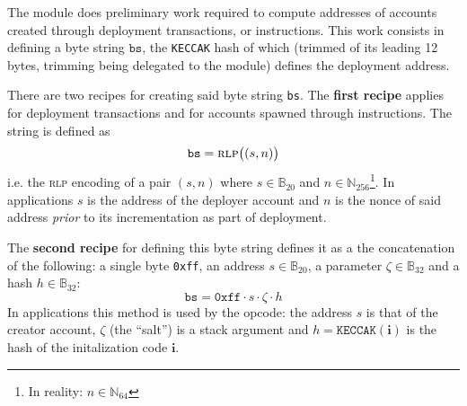The \rlpAddrMod{} module does preliminary work required to compute addresses of accounts created through deployment transactions,  or  instructions. This work consists in defining a byte string $\texttt{bs}$, the \texttt{KECCAK} hash of which (trimmed of its leading 12 bytes, trimming being delegated to the \trmMod{} module) defines the deployment address.

There are two recipes for creating said byte string \texttt{bs}. The \textbf{first recipe} applies for deployment transactions and for accounts spawned through  instructions. The string is defined as
\[
    \texttt{bs} = \textsc{rlp}\big((s,n)\big)
\]
i.e. the \textsc{rlp} encoding of a pair $(s, n)$ where $s \in \mathbb{B}_{20}$ and $n \in \mathbb{N}_{256}$\footnote{In reality: $n \in \mathbb{N}_{64}$}. In applications $s$ is the address of the deployer account and $n$ is the nonce of said address \emph{prior} to its incrementation as part of deployment.

The \textbf{second recipe} for defining this byte string defines it as a the concatenation of the following: a single byte \texttt{0xff}, an address $s\in\mathbb{B}_{20}$, a parameter $\zeta \in \mathbb{B}_{32}$ and a hash $h \in\mathbb{B}_{32}$:
\[
    \texttt{bs} =
    \texttt{0xff} \cdot
    s \cdot
    \zeta \cdot
    h
\]
In applications this method is used by the  opcode: the address $s$ is that of the creator account, $\zeta$ (the ``salt'') is a stack argument and $h = \texttt{KECCAK}(\textbf{i})$ is the hash of the initalization code $\textbf{i}$.

